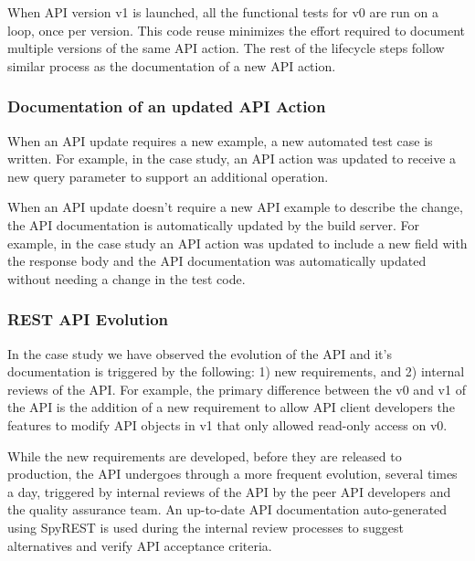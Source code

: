 \documentclass[10pt, conference]{IEEEtran}
\begin{document}
When API version v1 is launched, all the functional tests for v0 are run on a loop, once per version. This code reuse minimizes the effort required to document multiple versions of the same API action. The rest of the lifecycle steps follow similar process as the documentation of a new API action.

\subsubsection{Documentation of an updated API Action}
When an API update requires a new example, a new automated test case is written. For example, in the case study, an API action was updated to receive a new query parameter to support an additional operation.

When an API update doesn't require a new API example to describe the change, the API documentation is automatically updated by the build server. For example, in the case study an API action was updated to include a new field with the response body and the API documentation was automatically updated without needing a change in the test code.

\subsubsection{REST API Evolution} %
\label{sub:rest_api_evolution}
In the case study we have observed the evolution of the API and it's documentation is triggered by the following: 1) new requirements, and 2) internal reviews of the API. For example, the primary difference between the v0 and v1 of the API is the addition of a new requirement to allow API client developers the features to modify API objects in v1 that only allowed read-only access on v0.

While the new requirements are developed, before they are released to production, the API undergoes through a more frequent evolution, several times a day, triggered by internal reviews of the API by the peer API developers and the quality assurance team. An up-to-date API documentation auto-generated using SpyREST is used during the internal review processes to suggest alternatives and verify API acceptance criteria.




\end{document}
